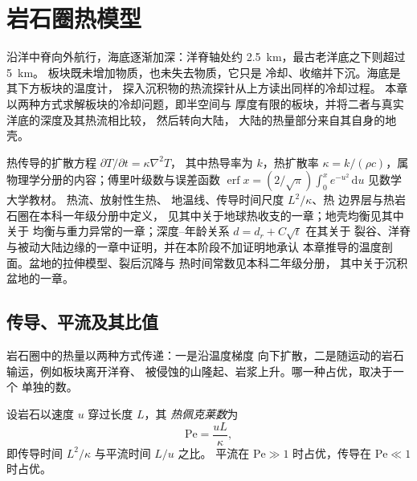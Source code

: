 \chapter{岩石圈热模型}\label{ch:b3:lithosphere-thermal-models}

沿洋中脊向外航行，海底逐渐加深：洋脊轴处约
\qty{2.5}{km}，最古老洋底之下则超过 \qty{5}{km}。
板块既未增加物质，也未失去物质，它只是
冷却、收缩并下沉。海底是其下方板块的温度计，
探入沉积物的热流探针从上方读出同样的冷却过程。
本章以两种方式求解板块的冷却问题，即半空间与
厚度有限的板块，并将二者与真实洋底的深度及其热流相比较，
然后转向大陆，
大陆的热量部分来自其自身的地壳。

\begin{recall}
热传导的扩散方程 $\partial T/\partial t = \kappa\nabla^2T$，
其中热导率为 $k$，热扩散率 $\kappa =
k/(\rho c)$，属物理学分册的内容；傅里叶级数与误差函数
$\operatorname{erf}x = (2/\sqrt\pi)\int_0^xe^{-u^2}\,\mathrm du$ 见数学大学教材。
热流、放射性生热、
地温线、传导时间尺度 $L^2/\kappa$、热
边界层与热岩石圈在本科一年级分册中定义，
见其中关于地球热收支的一章；地壳均衡见其中关于
均衡与重力异常的一章；深度–年龄关系 $d = d_r + C\sqrt t$ 在其关于
裂谷、洋脊与被动大陆边缘的一章中证明，并在本阶段不加证明地承认
本章推导的温度剖面。盆地的拉伸模型、裂后沉降与
热时间常数见本科二年级分册，
其中关于沉积盆地的一章。
\end{recall}

\section{传导、平流及其比值}

岩石圈中的热量以两种方式传递：一是沿温度梯度
向下扩散，二是随运动的岩石输运，例如板块离开洋脊、
被侵蚀的山隆起、岩浆上升。哪一种占优，取决于一个
单独的数。

\begin{definition}[热佩克莱数]\label{def:b3:lithosphere-thermal-models:peclet}
设岩石以速度 $u$ 穿过长度 $L$，其
\emph{热佩克莱数}为
\[
  \mathrm{Pe} = \frac{uL}{\kappa},
\]
即传导时间 $L^2/\kappa$ 与平流时间 $L/u$ 之比。
平流在 $\mathrm{Pe} \gg 1$ 时占优，传导在
$\mathrm{Pe} \ll 1$ 时占优。
\end{definition}

